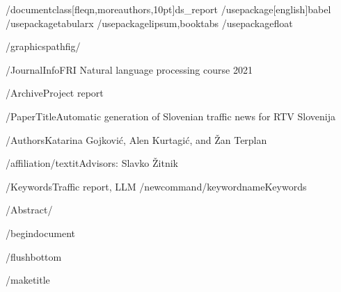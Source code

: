% 
%
%
%


/documentclass[fleqn,moreauthors,10pt]{ds_report}
/usepackage[english]{babel}
/usepackage{tabularx}
/usepackage{lipsum,booktabs}
/usepackage{float}

/graphicspath{{fig/}}





/JournalInfo{FRI Natural language processing course 2021}

/Archive{Project report} 

/PaperTitle{Automatic generation of Slovenian traffic news for RTV Slovenija} 

/Authors{Katarina Gojković, Alen Kurtagić, and Žan Terplan}

/affiliation{/textit{Advisors: Slavko Žitnik}}

/Keywords{Traffic report, LLM}
/newcommand{/keywordname}{Keywords}



/Abstract{/
}


/begin{document}

/flushbottom 

/maketitle 

